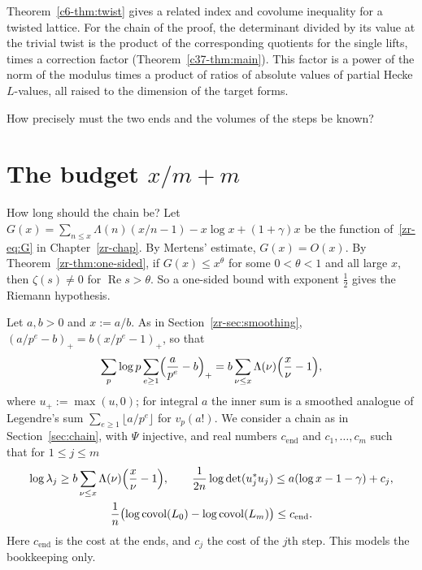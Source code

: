 \documentclass[reqno]{amsart}
\newcounter{chap}
\theoremstyle{definition}
\theoremstyle{plain}
\newcommand{\covol}{\operatorname{covol}}
\begin{document}
Theorem~\ref{c6-thm:twist} gives a related index and covolume inequality for a twisted lattice.  For the chain of the proof, the determinant divided by its value at the trivial twist is the product of the corresponding quotients for the single lifts, times a correction factor (Theorem~\ref{c37-thm:main}).  This factor is a power of the norm of the modulus times a product of ratios of absolute values of partial Hecke \(L\)-values, all raised to the dimension of the target forms.

How precisely must the two ends and the volumes of the steps be known?

\section{The budget \texorpdfstring{\(x/m + m\)}{x/m + m}}\label{sec:budget}

How long should the chain be?  Let \(G(x) = \sum_{n \le x} \Lambda(n) (x/n - 1) - x\log x + (1 + \gamma)x\) be the function of~\eqref{zr-eq:G} in Chapter~\ref{zr-chap}.  By Mertens' estimate, \(G(x) = O(x)\).  By Theorem~\ref{zr-thm:one-sided}, if \(G(x) \le x^\theta\) for some \(0 < \theta < 1\) and all large \(x\), then \(\zeta(s) \ne 0\) for \(\operatorname{Re} s > \theta\).  So a one-sided bound with exponent \(\tfrac12\) gives the Riemann hypothesis.

Let \(a, b > 0\) and \(x := a/b\).  As in Section~\ref{zr-sec:smoothing}, \((a/p^e - b)_+ = b(x/p^e - 1)_+\), so that
\[
  \sum_p \log p \sum_{e \ge 1} \Bigl( \frac{a}{p^e} - b \Bigr)_+ = b \sum_{\nu \le x} \Lambda(\nu) \Bigl( \frac{x}{\nu} - 1 \Bigr) ,
\]
where \(u_+ := \max(u, 0)\); for integral \(a\) the inner sum is a smoothed analogue of Legendre's sum \(\sum_{e \ge 1} \lfloor a/p^e \rfloor\) for \(v_p(a!)\).  We consider a chain as in Section~\ref{sec:chain}, with \(\Psi\) injective, and real numbers \(c_{\mathrm{end}}\) and \(c_1, \dots, c_m\) such that for \(1 \le j \le m\)
\begin{equation}\label{eq:toy}
\begin{gathered}
  \log \lambda_j \ge b \sum_{\nu \le x} \Lambda(\nu) \Bigl( \frac{x}{\nu} - 1 \Bigr) , \qquad \frac{1}{2n} \log \det(u_j^* u_j) \le a(\log x - 1 - \gamma) + c_j , \\
  \frac1n \bigl( \log \covol(L_0) - \log \covol(L_m) \bigr) \le c_{\mathrm{end}} .
\end{gathered}
\end{equation}
Here \(c_{\mathrm{end}}\) is the cost at the ends, and \(c_j\) the cost of the \(j\)th step.  This models the bookkeeping only.
\end{document}
